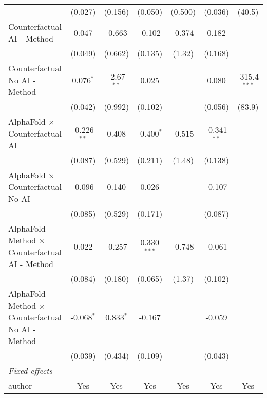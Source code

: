 \begin{tabular}{lcccccc}
                                                              & (0.027)       & (0.156)       & (0.050)       & (0.500)     & (0.036)       & (40.5)\\   
   Counterfactual AI - Method                                 & 0.047         & -0.663        & -0.102        & -0.374      & 0.182         &   \\   
                                                              & (0.049)       & (0.662)       & (0.135)       & (1.32)      & (0.168)       &   \\   
   Counterfactual No AI - Method                              & 0.076$^{*}$   & -2.67$^{**}$  & 0.025         &             & 0.080         & -315.4$^{***}$\\   
                                                              & (0.042)       & (0.992)       & (0.102)       &             & (0.056)       & (83.9)\\   
   AlphaFold $\times$ Counterfactual AI                       & -0.226$^{**}$ & 0.408         & -0.400$^{*}$  & -0.515      & -0.341$^{**}$ &   \\   
                                                              & (0.087)       & (0.529)       & (0.211)       & (1.48)      & (0.138)       &   \\   
   AlphaFold $\times$ Counterfactual No AI                    & -0.096        & 0.140         & 0.026         &             & -0.107        &   \\   
                                                              & (0.085)       & (0.529)       & (0.171)       &             & (0.087)       &   \\   
   AlphaFold - Method $\times$ Counterfactual AI - Method     & 0.022         & -0.257        & 0.330$^{***}$ & -0.748      & -0.061        &   \\   
                                                              & (0.084)       & (0.180)       & (0.065)       & (1.37)      & (0.102)       &   \\   
   AlphaFold - Method $\times$ Counterfactual No AI - Method  & -0.068$^{*}$  & 0.833$^{*}$   & -0.167        &             & -0.059        &   \\   
                                                              & (0.039)       & (0.434)       & (0.109)       &             & (0.043)       &   \\   
   \midrule
   \emph{Fixed-effects}\\
   author                                                     & Yes           & Yes           & Yes           & Yes         & Yes           & Yes\\  

\end{tabular}
